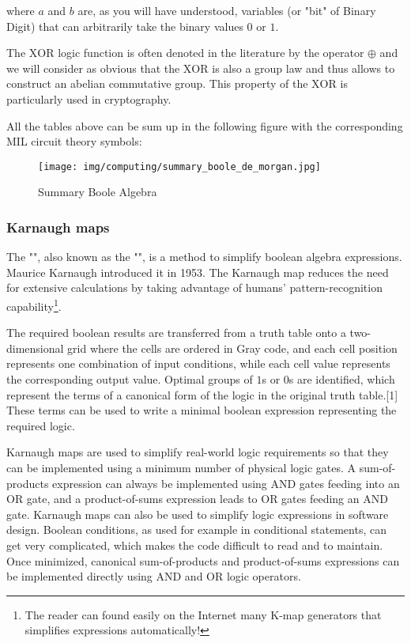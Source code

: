 	where $a$ and $b$ are, as you will have understood, variables (or "bit" of Binary Digit) that can arbitrarily take the binary values $0$ or $1$.
	\begin{tcolorbox}[title=Remark,colframe=black,arc=10pt]
	The $\mathrm{XOR}$ logic function is often denoted in the literature by the operator $\oplus$ and we will consider as obvious that the $\mathrm{XOR}$ is also a group law and thus allows to construct an abelian commutative group. This property of the $\mathrm{XOR}$ is particularly used in cryptography.
	\end{tcolorbox}
	All the tables above can be sum up in the following figure with the corresponding MIL circuit theory symbols:
	\begin{figure}[H]
		\centering
		\texttt{[image: img/computing/summary\_boole\_de\_morgan.jpg]}
		\caption{Summary Boole Algebra}
	\end{figure}
	
	\pagebreak
	\subsubsection{Karnaugh maps}
	The "", also known as the "", is a method to simplify boolean algebra expressions. Maurice Karnaugh introduced it in 1953. The Karnaugh map reduces the need for extensive calculations by taking advantage of humans' pattern-recognition capability\footnote{The reader can found easily on the Internet many K-map generators that simplifies expressions automatically!}. 
	
	The required boolean results are transferred from a truth table onto a two-dimensional grid where the cells are ordered in Gray code, and each cell position represents one combination of input conditions, while each cell value represents the corresponding output value. Optimal groups of $1$s or $0$s are identified, which represent the terms of a canonical form of the logic in the original truth table.[1] These terms can be used to write a minimal boolean expression representing the required logic.
	
	Karnaugh maps are used to simplify real-world logic requirements so that they can be implemented using a minimum number of physical logic gates. A sum-of-products expression can always be implemented using AND gates feeding into an OR gate, and a product-of-sums expression leads to OR gates feeding an AND gate. Karnaugh maps can also be used to simplify logic expressions in software design. Boolean conditions, as used for example in conditional statements, can get very complicated, which makes the code difficult to read and to maintain. Once minimized, canonical sum-of-products and product-of-sums expressions can be implemented directly using AND and OR logic operators.
	
